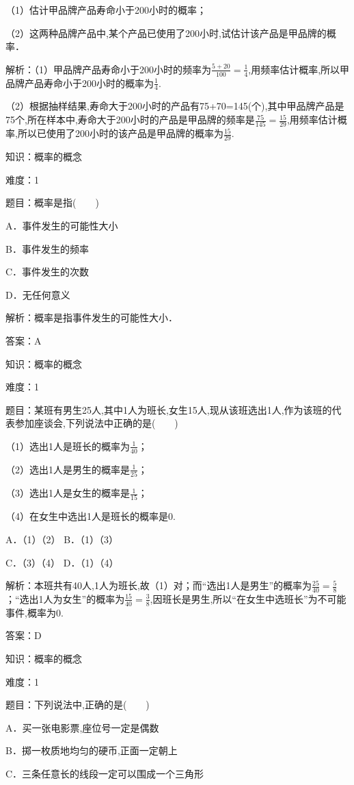\documentclass{article} %
\begin{document}
（1）估计甲品牌产品寿命小于200小时的概率；

（2）这两种品牌产品中,某个产品已使用了200小时,试估计该产品是甲品牌的概率．

解析：（1）甲品牌产品寿命小于200小时的频率为$\frac{5+20}{100}=\frac{1}{4}$,用频率估计概率,所以甲品牌产品寿命小于200小时的概率为$\frac{1}{4}$.

（2）根据抽样结果,寿命大于200小时的产品有75+70=145(个),其中甲品牌产品是75个,所在样本中,寿命大于200小时的产品是甲品牌的频率是$\frac{75}{145}=\frac{15}{29}$,用频率估计概率,所以已使用了200小时的该产品是甲品牌的概率为$\frac{15}{29}$.


知识：概率的概念

难度：1

题目：概率是指(　　)

A．事件发生的可能性大小

B．事件发生的频率

C．事件发生的次数

D．无任何意义

解析：概率是指事件发生的可能性大小．

答案：A

知识：概率的概念

难度：1

题目：某班有男生25人,其中1人为班长,女生15人,现从该班选出1人,作为该班的代表参加座谈会,下列说法中正确的是(　　)

（1）选出1人是班长的概率为$\frac{1}{40}$；

（2）选出1人是男生的概率是$\frac{1}{25}$；

（3）选出1人是女生的概率是$\frac{1}{15}$；

（4）在女生中选出1人是班长的概率是0.

A．（1）（2）  B．（1）（3）

C．（3）（4）  D．（1）（4）

解析：本班共有40人,1人为班长,故（1）对；而``选出1人是男生''的概率为$\frac{25}{40}=\frac{5}{8}$；``选出1人为女生''的概率为$\frac{15}{40}=\frac{3}{8}$,因班长是男生,所以``在女生中选班长''为不可能事件,概率为0.

答案：D

知识：概率的概念

难度：1

题目：下列说法中,正确的是(　　)

A．买一张电影票,座位号一定是偶数

B．掷一枚质地均匀的硬币,正面一定朝上

C．三条任意长的线段一定可以围成一个三角形
\end{document}
